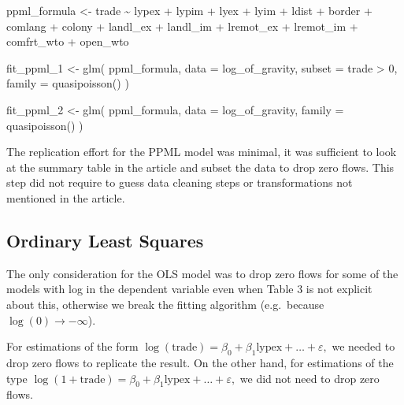 \documentclass[12pt]{article}
\newenvironment{Shaded}{\begin{snugshade}}{\end{snugshade}}
\newcommand{\AttributeTok}[1]{\textcolor[rgb]{0.40,0.45,0.13}{#1}}
\newcommand{\DecValTok}[1]{\textcolor[rgb]{0.68,0.00,0.00}{#1}}
\newcommand{\FunctionTok}[1]{\textcolor[rgb]{0.28,0.35,0.67}{#1}}
\newcommand{\NormalTok}[1]{\textcolor[rgb]{0.00,0.23,0.31}{#1}}
\newcommand{\OtherTok}[1]{\textcolor[rgb]{0.00,0.23,0.31}{#1}}
\newcommand{\SpecialCharTok}[1]{\textcolor[rgb]{0.37,0.37,0.37}{#1}}
\begin{document}
\begin{Shaded}
\begin{Highlighting}[]
\NormalTok{ppml\_formula }\OtherTok{\textless{}{-}}\NormalTok{ trade }\SpecialCharTok{\textasciitilde{}}\NormalTok{ lypex }\SpecialCharTok{+}\NormalTok{ lypim }\SpecialCharTok{+}\NormalTok{ lyex }\SpecialCharTok{+}\NormalTok{ lyim }\SpecialCharTok{+}\NormalTok{ ldist }\SpecialCharTok{+}\NormalTok{ border }\SpecialCharTok{+}
\NormalTok{  comlang }\SpecialCharTok{+}\NormalTok{ colony }\SpecialCharTok{+}\NormalTok{ landl\_ex }\SpecialCharTok{+}\NormalTok{ landl\_im }\SpecialCharTok{+}\NormalTok{ lremot\_ex }\SpecialCharTok{+}\NormalTok{ lremot\_im }\SpecialCharTok{+}
\NormalTok{  comfrt\_wto }\SpecialCharTok{+}\NormalTok{ open\_wto}

\NormalTok{fit\_ppml\_1 }\OtherTok{\textless{}{-}} \FunctionTok{glm}\NormalTok{(}
\NormalTok{  ppml\_formula,}
  \AttributeTok{data =}\NormalTok{ log\_of\_gravity,}
  \AttributeTok{subset =}\NormalTok{ trade }\SpecialCharTok{\textgreater{}} \DecValTok{0}\NormalTok{,}
  \AttributeTok{family =} \FunctionTok{quasipoisson}\NormalTok{()}
\NormalTok{)}

\NormalTok{fit\_ppml\_2 }\OtherTok{\textless{}{-}} \FunctionTok{glm}\NormalTok{(}
\NormalTok{  ppml\_formula,}
  \AttributeTok{data =}\NormalTok{ log\_of\_gravity,}
  \AttributeTok{family =} \FunctionTok{quasipoisson}\NormalTok{()}
\NormalTok{)}
\end{Highlighting}
\end{Shaded}

The replication effort for the PPML model was minimal, it was sufficient
to look at the summary table in the article and subset the data to drop
zero flows. This step did not require to guess data cleaning steps or
transformations not mentioned in the article.

\subsection{Ordinary Least Squares}\label{ordinary-least-squares}

The only consideration for the OLS model was to drop zero flows for some
of the models with log in the dependent variable even when Table 3 is
not explicit about this, otherwise we break the fitting algorithm
(e.g.~because \(\log(0) \to -\infty\)).

For estimations of the form
\(\log(\text{trade}) = \beta_0 + \beta_1 \text{lypex} + \dots + \varepsilon,\)
we needed to drop zero flows to replicate the result. On the other hand,
for estimations of the type
\(\log(1 + \text{trade}) = \beta_0 + \beta_1 \text{lypex} + \dots + \varepsilon,\)
we did not need to drop zero flows.
\end{document}
